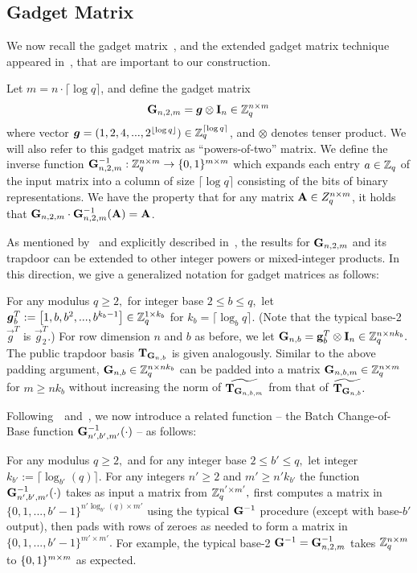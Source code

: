 \subsection{Gadget Matrix}
We now recall the gadget matrix~\cite{EC:MicPei12,C:AlpPei14}, and the extended gadget matrix technique appeared in~\cite{EPRINT:ApoFanLiu16a}, that are important to our construction.
\begin{definition}
Let $m = n \cdot \lceil\log q \rceil$, and define the gadget matrix
$$\mathbf{G}_{n, 2, m} = \boldsymbol{g} \otimes \mathbf{I}_n \in \mathbb{Z}_q^{n \times m}$$
where vector $\boldsymbol{g} = (1, 2, 4,..., 2^{\lfloor \log q \rfloor}) \in \mathbb{Z}_q^{\lceil \log q \rceil}$, and $\otimes$ denotes tenser product. We will also refer to this gadget matrix as ``powers-of-two'' matrix. We define the inverse function $\mathbf{G}^{-1}_{n, 2, m}: \mathbb{Z}_q^{n \times m} \rightarrow \{0,1\}^{m \times m}$ which expands each entry $a \in \mathbb{Z}_q$ of the input matrix into a column of size $\lceil \log q \rceil$ consisting of the bits of binary representations. We have the property that for any matrix $\mathbf{A} \in Z_q^{n \times m}$, it holds that $\mathbf{G}_{n, 2, m} \cdot \mathbf{G}^{-1}_{n, 2, m}(\mathbf{A}) = \mathbf{A}$.
\end{definition}
As mentioned by~\cite{EC:MicPei12} and explicitly described in~\cite{EPRINT:ApoFanLiu16a}, the results for $\mathbf{G}_{n, 2, m}$ and its trapdoor can be extended to other integer powers or mixed-integer products. In this direction, we give
a generalized notation for gadget matrices as follows:

For any modulus $q\ge 2,$ for integer base $2 \le b \le q,$ let $\boldsymbol{g}_{b}^T := \left[1, b, b^2, ..., b^{k_b-1}\right]\in\mathbb{Z}_q^{1\times k_b}$ for $k_b = \lceil\log_b{q}\rceil.$ (Note that the typical base-2 $\vec g^T$ is $\vec g_2^T.$) For row dimension $n$ and $b$ as before, we let $\mathbf{G}_{n, b} = \mathbf{g}_{b}^T\otimes\mathbf{I}_{n}\in\mathbb{Z}_q^{n\times nk_b}.$ The public trapdoor basis $\mathbf{T}_{\mathbf{G}_{n, b}}$ is given analogously. Similar to the above padding argument, $\mathbf{G}_{n, b}\in\mathbb{Z}_q^{n\times nk_b}$ can be padded into a matrix $\mathbf{G}_{n, b, m}\in\mathbb{Z}_{q}^{n\times m}$ for $m\geq  nk_b$ without increasing the norm of $\widetilde{\mathbf{T}_{\mathbf{G}_{n, b, m}}}$ from that of $\widetilde{\mathbf{T}_{\mathbf{G}_{n, b}}}.$

Following~\cite{PKC:Xagawa13}~and~\cite{C:AlpPei14}, we now introduce a related function -- the Batch Change-of-Base function $\mathbf{G}_{n', b', m'}^{-1}(\cdot)$ -- as follows:

For any modulus $q\ge 2,$ and for any integer base $2 \le b' \le q,$ let integer $k_{b'} := \lceil\log_{b'}(q)\rceil.$
For any integers $n'\ge 2$ and $m'\ge n'k_{b'}$ the function $\mathbf{G}_{n', b', m'}^{-1}(\cdot)$ takes as input a matrix from $\mathbb{Z}_q^{n'\times m'},$ first computes a matrix in $\{0, 1, ..., b'-1\}^{n'\log_{b'}(q)\times m'}$ using the typical $\mathbf{G}^{-1}$ procedure (except with base-$b'$ output), then pads with rows of zeroes as needed to form a matrix in $\{0, 1, ..., b'-1\}^{m'\times m'}.$ For example, the typical base-2 $\mathbf{G}^{-1} = \mathbf{G}^{-1}_{n, 2, m}$ takes $\mathbb{Z}_q^{n\times m}$ to $\{0,1\}^{m\times m}$ as expected.
